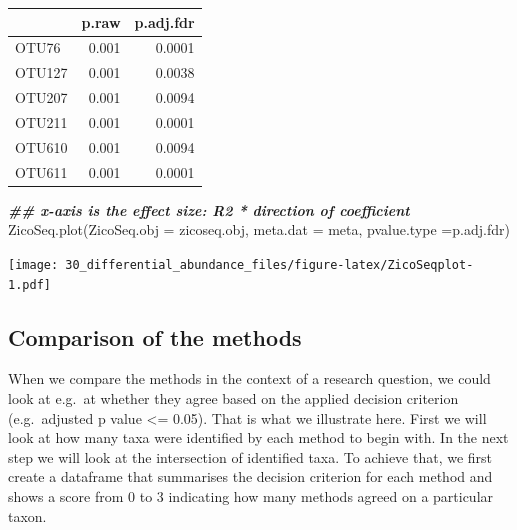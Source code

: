 \documentclass[
]{book}
\newenvironment{Shaded}{\begin{snugshade}}{\end{snugshade}}
\newcommand{\AttributeTok}[1]{\textcolor[rgb]{0.77,0.63,0.00}{#1}}
\newcommand{\DocumentationTok}[1]{\textcolor[rgb]{0.56,0.35,0.01}{\textbf{\textit{#1}}}}
\newcommand{\FloatTok}[1]{\textcolor[rgb]{0.00,0.00,0.81}{#1}}
\newcommand{\FunctionTok}[1]{\textcolor[rgb]{0.00,0.00,0.00}{#1}}
\newcommand{\NormalTok}[1]{#1}
\newcommand{\OtherTok}[1]{\textcolor[rgb]{0.56,0.35,0.01}{#1}}
\newcommand{\SpecialCharTok}[1]{\textcolor[rgb]{0.00,0.00,0.00}{#1}}
\newcommand{\StringTok}[1]{\textcolor[rgb]{0.31,0.60,0.02}{#1}}
\begin{document}
\begin{Shaded}
\end{Shaded}

\begin{tabular}{l|r|r}
\hline
  & p.raw & p.adj.fdr\\
\hline
OTU76 & 0.001 & 0.0001\\
\hline
OTU127 & 0.001 & 0.0038\\
\hline
OTU207 & 0.001 & 0.0094\\
\hline
OTU211 & 0.001 & 0.0001\\
\hline
OTU610 & 0.001 & 0.0094\\
\hline
OTU611 & 0.001 & 0.0001\\
\hline
\end{tabular}

\begin{Shaded}
\begin{Highlighting}[]
\DocumentationTok{\#\# x{-}axis is the effect size: R2 * direction of coefficient}
\FunctionTok{ZicoSeq.plot}\NormalTok{(}\AttributeTok{ZicoSeq.obj =}\NormalTok{ zicoseq.obj, }\AttributeTok{meta.dat =}\NormalTok{ meta, }\AttributeTok{pvalue.type =}\StringTok{\textquotesingle{}p.adj.fdr\textquotesingle{}}\NormalTok{)}
\end{Highlighting}
\end{Shaded}

\texttt{[image: 30\_differential\_abundance\_files/figure-latex/ZicoSeqplot-1.pdf]}

\hypertarget{comparison-of-the-methods}{%
\subsection{Comparison of the methods}\label{comparison-of-the-methods}}

When we compare the methods in the context of a research question, we could
look at e.g.~at whether they agree based on the applied decision criterion
(e.g.~adjusted p value \textless= 0.05). That is what we illustrate here. First we will
look at how many taxa were identified by each method to begin with. In the next
step we will look at the intersection of identified taxa. To achieve that, we
first create a dataframe that summarises the decision criterion for each method
and shows a score from 0 to 3 indicating how many methods agreed on a particular
taxon.
\end{document}
